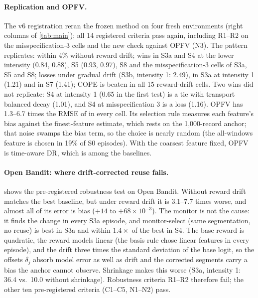 \paragraph{Replication and OPFV.}
The v6 registration reran the frozen method on four fresh environments (right columns of
\cref{tab:main}); all 14 registered criteria pass again, including R1--R2 on the
misspecification-3 cells and the new check against OPFV (N3). The pattern replicates: within 4\%
without reward drift; wins in S3a and S4 at the lower intensity (0.84, 0.88), S5 (0.93, 0.97), S8
and the misspecification-3 cells of S3a, S5 and S8; losses under gradual drift (S3b, intensity 1:
2.49), in S3a at intensity 1 (1.21) and in S7 (1.41); COPE is beaten in all 15 reward-drift cells.
Two wins did not replicate: S4 at intensity 1 (0.65 in the first test) is a tie with transport
balanced decay (1.01), and S4 at misspecification 3 is a loss (1.16). OPFV has 1.3--6.7 times the
RMSE of \odrift{} in every cell. Its selection rule measures each feature's bias against the
finest-feature estimate, which rests on the 1{,}000-record anchor; that noise swamps the bias term,
so the choice is nearly random (the all-windows feature is chosen in 19\% of S0 episodes). With the
coarsest feature fixed, OPFV is time-aware DR, which is among the baselines.



\paragraph{Open Bandit: where drift-corrected reuse fails.}
 shows the pre-registered robustness test on Open Bandit. Without reward drift
\odrift{} matches the best baseline, but under reward drift it is 3.1--7.7 times worse, and
almost all of its error is bias ($+14$ to $+68\times10^{-3}$). The monitor is not the cause: it
finds the change in every S3a episode, and monitor-select (same segmentation, no reuse) is
best in S3a and within $1.4\times$ of the best in S4. The base
reward is quadratic, the reward models linear (the basis rule chose linear features in every
episode), and the drift three times the standard deviation of the base logit, so the offsets
$\delta_j$ absorb model error as well as drift and the corrected segments carry a bias the
anchor cannot observe. Shrinkage makes this worse (S3a, intensity 1: 36.4 vs.\ 10.0 without shrinkage). Robustness criteria R1--R2
therefore fail; the other ten pre-registered criteria (C1--C5, N1--N2) pass.

